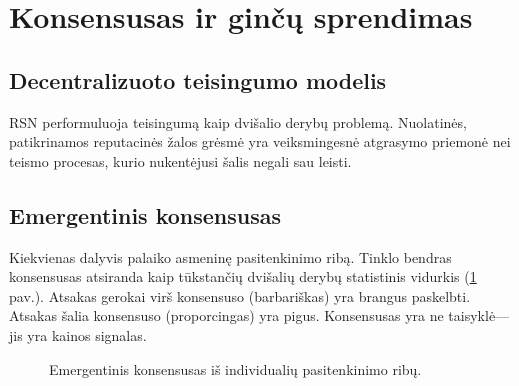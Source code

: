 \documentclass[11pt,a4paper,twocolumn]{article}
\begin{document}
\section{Konsensusas ir ginčų sprendimas}

\subsection{Decentralizuoto teisingumo modelis}

RSN performuluoja teisingumą kaip dvišalio derybų problemą. Nuolatinės, patikrinamos reputacinės žalos grėsmė yra veiksmingesnė atgrasymo priemonė nei teismo procesas, kurio nukentėjusi šalis negali sau leisti.

\subsection{Emergentinis konsensusas}

Kiekvienas dalyvis palaiko asmeninę pasitenkinimo ribą. Tinklo bendras konsensusas atsiranda kaip tūkstančių dvišalių derybų statistinis vidurkis (\ref{fig:consensus} pav.). Atsakas gerokai virš konsensuso (barbariškas) yra brangus paskelbti. Atsakas šalia konsensuso (proporcingas) yra pigus. Konsensusas yra ne taisyklė---jis yra kainos signalas.

\begin{figure}[ht]
\centering
{}
\caption{Emergentinis konsensusas iš individualių pasitenkinimo ribų.}
\label{fig:consensus}
\end{figure}
\end{document}
